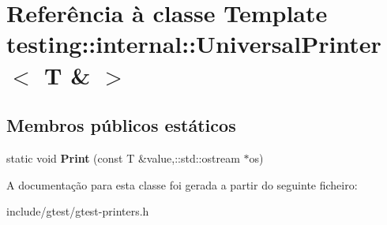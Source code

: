 \hypertarget{classtesting_1_1internal_1_1UniversalPrinter_3_01T_01_6_01_4}{\section{Referência à classe Template testing\-:\-:internal\-:\-:Universal\-Printer$<$ T \& $>$}
\label{classtesting_1_1internal_1_1UniversalPrinter_3_01T_01_6_01_4}
}
\subsection*{Membros públicos estáticos}
\begin{DoxyCompactItemize}
\item 
\hypertarget{classtesting_1_1internal_1_1UniversalPrinter_3_01T_01_6_01_4_a2a63ddb20294c4234b7e8f3c7a56355d}{static void {\bfseries Print} (const T \&value,\-::std\-::ostream $\ast$os)}\label{classtesting_1_1internal_1_1UniversalPrinter_3_01T_01_6_01_4_a2a63ddb20294c4234b7e8f3c7a56355d}

\end{DoxyCompactItemize}


A documentação para esta classe foi gerada a partir do seguinte ficheiro\-:\begin{DoxyCompactItemize}
\item 
include/gtest/gtest-\/printers.\-h\end{DoxyCompactItemize}
